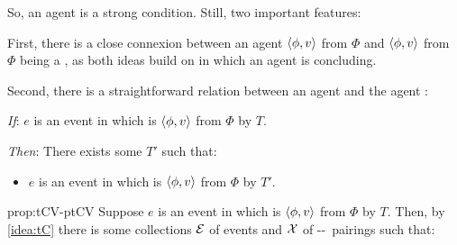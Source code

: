 \begin{note}
  So, an agent  is a strong condition.
  Still, two important features:

  First, there is a close connexion between an agent \ptCV{} \(\langle \phi, v \rangle\) from \(\Phi\) and \(\langle \phi, v \rangle\) from \(\Phi\) being a \fc{}, as both ideas build on  in which an agent is concluding.

  Second, there is a straightforward relation between an agent \tCV{} and the agent :

  \begin{proposition}%
    \label{prop:tCV-ptCV}%

    \noindent%

    \begin{itenum}
    \item[\emph{If}:]
      \(e\) is an event in which \vAgent{} is \tCV{} \(\langle \phi, v \rangle\) from \(\Phi\) by \torN{} \(T\).
    \item[\emph{Then}:]
      There exists some \torN{} \(T'\) such that:
      \begin{itemize}
      \item
        \(e\) is an event in which \vAgent{} is \ptCV{} \(\langle \phi, v \rangle\) from \(\Phi\) by \torN{} \(T'\).
      \end{itemize}
    \end{itenum}
    \vspace{-\baselineskip}
  \end{proposition}

  \begin{argument}{prop:tCV-ptCV}
    Suppose  \(e\) is an event in which \vAgent{} is \tCV{} \(\langle \phi, v \rangle\) from \(\Phi\) by \torN{} \(T\).
    Then, by \autoref{idea:tC} there is some collections \({\cal E}\) of events and \({\cal X}\) of --~pairings such that:


\end{argument}
\end{note}
